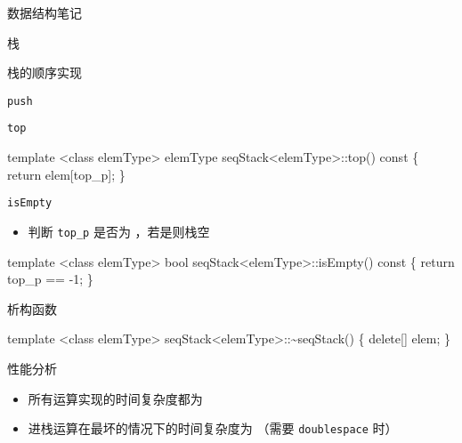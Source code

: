 \documentclass[
  ignorenonframetext,
]{beamer}
\newenvironment{Shaded}{}{}
\newcommand{\NormalTok}[1]{#1}
\providecommand{\tightlist}{%
  \setlength{\itemsep}{0pt}\setlength{\parskip}{0pt}}
\begin{document}
\begin{frame}[fragile]{数据结构笔记}
\begin{block}{栈}
\begin{block}{栈的顺序实现}
\begin{block}{\texttt{push}}
\begin{block}{\texttt{top}}
\begin{Shaded}
\begin{Highlighting}[]
\NormalTok{template \textless{}class elemType\textgreater{}}
\NormalTok{elemType seqStack\textless{}elemType\textgreater{}::top() const}
\NormalTok{\{}
\NormalTok{  return elem[top\_p];}
\NormalTok{\}}
\end{Highlighting}
\end{Shaded}
\end{block}

\begin{block}{\texttt{isEmpty}}
\protect{}\label{isempty}
\begin{itemize}
\tightlist
\item
  判断 \texttt{top\_p} 是否为 {}，若是则栈空
\end{itemize}

\begin{Shaded}
\begin{Highlighting}[]
\NormalTok{template \textless{}class elemType\textgreater{}}
\NormalTok{bool seqStack\textless{}elemType\textgreater{}::isEmpty() const}
\NormalTok{\{}
\NormalTok{  return top\_p == {-}1;}
\NormalTok{\}}
\end{Highlighting}
\end{Shaded}
\end{block}
\end{block}

\begin{block}{析构函数}
\protect{}\label{ux6790ux6784ux51fdux6570-1}
\begin{Shaded}
\begin{Highlighting}[]
\NormalTok{template \textless{}class elemType\textgreater{}}
\NormalTok{seqStack\textless{}elemType\textgreater{}::\textasciitilde{}seqStack()}
\NormalTok{\{}
\NormalTok{  delete[] elem;}
\NormalTok{\}}
\end{Highlighting}
\end{Shaded}
\end{block}

\begin{block}{性能分析}
\protect{}\label{ux6027ux80fdux5206ux6790}
\begin{itemize}
\tightlist
\item
  所有运算实现的时间复杂度都为 {}
\item
  进栈运算在最坏的情况下的时间复杂度为 {} （需要 \texttt{doublespace}
  时）
\end{itemize}
\end{block}
\end{block}


\end{block}
\end{frame}
\end{document}
